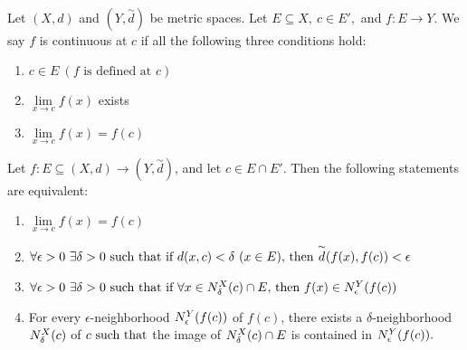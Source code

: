\begin{definition} \leavevmode \\
    Let $(X,d)$ and $(Y, \overset{\sim}{d})$ be metric spaces. Let $E \subseteq X, ~c \in E',$ and $f: E \to Y$. We say $f$ is continuous at $c$ if all the following three conditions hold:
    \begin{enumerate}[$(i)$]
        \item $c \in E ~(\text{$f$ is defined at $c$})$
        \item $\lim \limits_{x \to c}f(x)$ exists
        \item $\lim \limits_{x \to c}f(x) = f(c)$
    \end{enumerate}
\end{definition}

\begin{remark}
    Let $f: E\subseteq (X, d) \to (Y, \overset{\sim}{d})$, and let $c \in E \cap E'.$ Then the following statements are equivalent:
    \begin{enumerate}[$(i)$]
        \item $\lim \limits_{x\to c}f(x) = f(c)$
        \item $\forall \epsilon > 0 ~\exists \delta > 0 \text{ such that } \text{if $d(x,c) < \delta ~(x \in E),$ then $\overset{\sim}{d}(f(x), f(c)) < \epsilon$}$
        \item $\forall \epsilon > 0 ~\exists \delta > 0 \text{ such that } \text{if $\forall x \in N_{\delta}^{X}(c)\cap E,$ then $f(x) \in N_{\epsilon}^{Y}(f(c))$}$
        \item For every $\epsilon$-neighborhood $N_{\epsilon}^{Y}(f(c))$ of $f(c)$, there exists a $\delta$-neighborhood $N_{\delta}^{X}(c)$ of $c \text{ such that }$the image of $N_{\delta}^{X}(c)\cap E$ is contained in $N_{\epsilon}^{Y}(f(c)).$
    \end{enumerate}
\end{remark}

